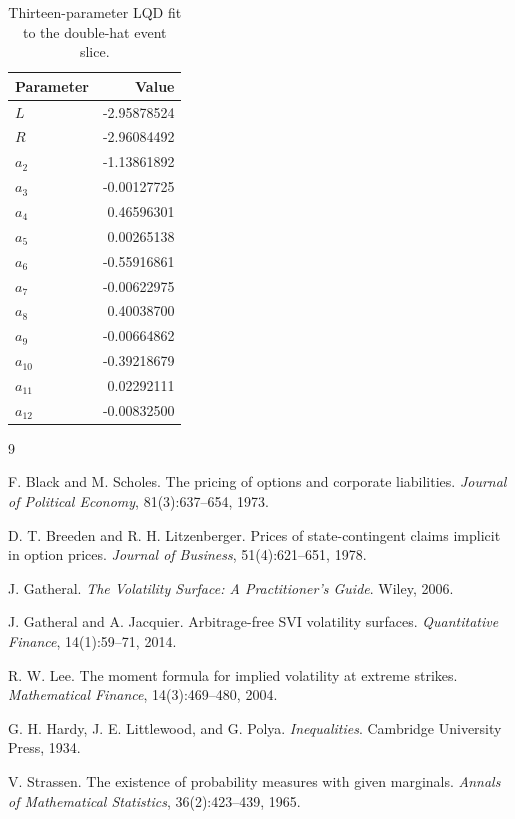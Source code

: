 \documentclass[11pt]{article}
\newcommand{\1}{\mathbf{1}}
\begin{document}
\begin{longtable}{lr}
\caption{Thirteen-parameter LQD fit to the double-hat event slice.}\label{tab:dh_coeffs}\\
\toprule
Parameter & Value\\
\midrule
$L$ & -2.95878524\\
$R$ & -2.96084492\\
$a_2$ & -1.13861892\\
$a_3$ & -0.00127725\\
$a_4$ & 0.46596301\\
$a_5$ & 0.00265138\\
$a_6$ & -0.55916861\\
$a_7$ & -0.00622975\\
$a_8$ & 0.40038700\\
$a_9$ & -0.00664862\\
$a_{10}$ & -0.39218679\\
$a_{11}$ & 0.02292111\\
$a_{12}$ & -0.00832500\\
\bottomrule
\end{longtable}

\begin{thebibliography}{9}

F. Black and M. Scholes.
The pricing of options and corporate liabilities.
\emph{Journal of Political Economy}, 81(3):637--654, 1973.

D. T. Breeden and R. H. Litzenberger.
Prices of state-contingent claims implicit in option prices.
\emph{Journal of Business}, 51(4):621--651, 1978.

J. Gatheral.
\emph{The Volatility Surface: A Practitioner's Guide}.
Wiley, 2006.

J. Gatheral and A. Jacquier.
Arbitrage-free SVI volatility surfaces.
\emph{Quantitative Finance}, 14(1):59--71, 2014.

R. W. Lee.
The moment formula for implied volatility at extreme strikes.
\emph{Mathematical Finance}, 14(3):469--480, 2004.

G. H. Hardy, J. E. Littlewood, and G. Polya.
\emph{Inequalities}.
Cambridge University Press, 1934.

V. Strassen.
The existence of probability measures with given marginals.
\emph{Annals of Mathematical Statistics}, 36(2):423--439, 1965.

\end{thebibliography}
\end{document}
